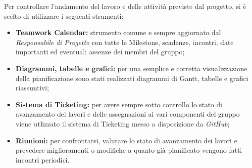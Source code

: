Per controllare l'andamento del lavoro e delle attività previste dal progetto, si è scelto di utilizzare i seguenti strumenti:
\begin{itemize}
	\item \textbf{Teamwork Calendar:} strumento comune e sempre aggiornato dal \textit{Responsabile di Progetto} con tutte le Milestone, scadenze, incontri, date importanti ed eventuali assenze dei membri del gruppo;
	\item \textbf{Diagrammi, tabelle e grafici:} per una semplice e corretta visualizzazione della pianificazione sono stati realizzati diagrammi di Gantt, tabelle e grafici riassuntivi;
	\item \textbf{Sistema di Ticketing:} per avere sempre sotto controllo lo stato di avanzamento dei lavori e delle assegnazioni ai vari componenti del gruppo viene utlizzato il sistema di Ticketing messo a disposizione da \textit{GitHub};
	\item \textbf{Riunioni:} per confrontarsi, valutare lo stato di avanzamento dei lavori e prevedere miglioramenti o modifiche a quanto già pianificato vengono fatti incontri periodici. 
\end{itemize}
